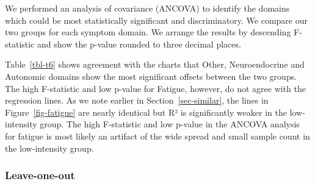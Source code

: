 \documentclass[
  letterpaper,
  DIV=11,
  numbers=noendperiod]{scrartcl}
\begin{document}
We performed an analysis of covariance (ANCOVA) to identify the domains
which could be most statistically significant and discriminatory. We
compare our two groups for each symptom domain. We arrange the results
by descending F-statistic and show the p-value rounded to three decimal
places.

\FloatBarrier

\begin{table}[h]

\caption{\label{tbl-t6}ANCOVA}


\end{table}%

Table~\ref{tbl-t6} shows agreement with the charts that Other,
Neuroendocrine and Autonomic domains show the most significant offsets
between the two groups. The high F-statistic and low p-value for
Fatigue, however, do not agree with the regression lines. As we note
earlier in Section~\ref{sec-similar}, the lines in
Figure~\ref{fig-fatigue} are nearly identical but R² is significantly
weaker in the low-intensity group. The high F-statistic and low p-value
in the ANCOVA analysis for fatigue is most likely an artifact of the
wide spread and small sample count in the low-intensity group.

\FloatBarrier

\subsubsection*{Leave-one-out}\label{sec-loo}
\end{document}

